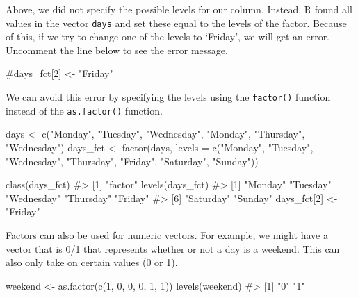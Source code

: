 \documentclass[
  letterpaper,
]{krantz}
\makeatletter
\newenvironment{Shaded}{\begin{snugshade}}{\end{snugshade}}
\newcommand{\AttributeTok}[1]{\textcolor[rgb]{0.40,0.45,0.13}{#1}}
\newcommand{\CommentTok}[1]{\textcolor[rgb]{0.37,0.37,0.37}{#1}}
\newcommand{\DecValTok}[1]{\textcolor[rgb]{0.68,0.00,0.00}{#1}}
\newcommand{\FunctionTok}[1]{\textcolor[rgb]{0.28,0.35,0.67}{#1}}
\newcommand{\NormalTok}[1]{\textcolor[rgb]{0.00,0.23,0.31}{#1}}
\newcommand{\OtherTok}[1]{\textcolor[rgb]{0.00,0.23,0.31}{#1}}
\newcommand{\StringTok}[1]{\textcolor[rgb]{0.13,0.47,0.30}{#1}}
\newenvironment{kframe}{%
\medskip{}
\setlength{\fboxsep}{.8em}
 \def\at@end@of@kframe{}%
 \ifinner\ifhmode%
  \def\at@end@of@kframe{\end{minipage}}%
  \begin{minipage}{\columnwidth}%
 \fi\fi%
 \def\FrameCommand##1{\hskip\@totalleftmargin \hskip-\fboxsep
 \colorbox{shadecolor}{##1}\hskip-\fboxsep
     \hskip-\linewidth \hskip-\@totalleftmargin \hskip\columnwidth}%
 \MakeFramed {\advance\hsize-\width
   \@totalleftmargin\z@ \linewidth\hsize
   \@setminipage}}%
 {\par\unskip\endMakeFramed%
 \at@end@of@kframe}
\renewenvironment{Shaded}{\begin{kframe}}{\end{kframe}}
\makeatother
\begin{document}
Above, we did not specify the possible levels for our column. Instead, R
found all values in the vector \texttt{days} and set these equal to the
levels of the factor. Because of this, if we try to change one of the
levels to `Friday', we will get an error. Uncomment the line below to
see the error message.

\begin{Shaded}
\begin{Highlighting}[]
\CommentTok{\#days\_fct[2] \textless{}{-} "Friday"   }
\end{Highlighting}
\end{Shaded}

We can avoid this error by specifying the levels using the
\texttt{factor()} function instead of the \texttt{as.factor()} function.

\begin{Shaded}
\begin{Highlighting}[]
\NormalTok{days }\OtherTok{\textless{}{-}} \FunctionTok{c}\NormalTok{(}\StringTok{"Monday"}\NormalTok{, }\StringTok{"Tuesday"}\NormalTok{, }\StringTok{"Wednesday"}\NormalTok{, }\StringTok{"Monday"}\NormalTok{, }\StringTok{"Thursday"}\NormalTok{, }
          \StringTok{"Wednesday"}\NormalTok{)}
\NormalTok{days\_fct }\OtherTok{\textless{}{-}} \FunctionTok{factor}\NormalTok{(days, }
               \AttributeTok{levels =} \FunctionTok{c}\NormalTok{(}\StringTok{"Monday"}\NormalTok{, }\StringTok{"Tuesday"}\NormalTok{, }\StringTok{"Wednesday"}\NormalTok{, }
                          \StringTok{"Thursday"}\NormalTok{, }\StringTok{"Friday"}\NormalTok{, }\StringTok{"Saturday"}\NormalTok{, }\StringTok{"Sunday"}\NormalTok{))}

\FunctionTok{class}\NormalTok{(days\_fct)}
\CommentTok{\#\textgreater{} [1] "factor"}
\FunctionTok{levels}\NormalTok{(days\_fct)}
\CommentTok{\#\textgreater{} [1] "Monday"    "Tuesday"   "Wednesday" "Thursday"  "Friday"   }
\CommentTok{\#\textgreater{} [6] "Saturday"  "Sunday"}
\NormalTok{days\_fct[}\DecValTok{2}\NormalTok{] }\OtherTok{\textless{}{-}} \StringTok{"Friday"}
\end{Highlighting}
\end{Shaded}

Factors can also be used for numeric vectors. For example, we might have
a vector that is 0/1 that represents whether or not a day is a weekend.
This can also only take on certain values (0 or 1).

\begin{Shaded}
\begin{Highlighting}[]
\NormalTok{weekend }\OtherTok{\textless{}{-}} \FunctionTok{as.factor}\NormalTok{(}\FunctionTok{c}\NormalTok{(}\DecValTok{1}\NormalTok{, }\DecValTok{0}\NormalTok{, }\DecValTok{0}\NormalTok{, }\DecValTok{0}\NormalTok{, }\DecValTok{1}\NormalTok{, }\DecValTok{1}\NormalTok{))}
\FunctionTok{levels}\NormalTok{(weekend)}
\CommentTok{\#\textgreater{} [1] "0" "1"}
\end{Highlighting}
\end{Shaded}
\end{document}
